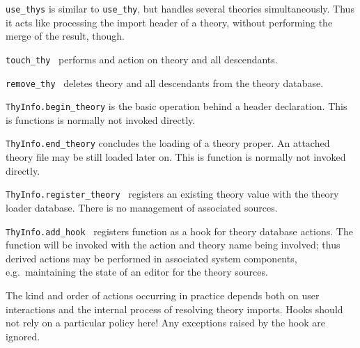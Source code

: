 \begin{isabellebody}
\begin{isamarkuptext}
\begin{description}
  \item \verb|use_thys| is similar to \verb|use_thy|, but handles
  several theories simultaneously.  Thus it acts like processing the
  import header of a theory, without performing the merge of the
  result, though.

  \item \verb|touch_thy|~ performs and  action
  on theory  and all descendants.

  \item \verb|remove_thy|~ deletes theory  and all
  descendants from the theory database.

  \item \verb|ThyInfo.begin_theory| is the basic operation behind a
  \isa{{\isasymTHEORY}} header declaration.  This is {\ML} functions is
  normally not invoked directly.

  \item \verb|ThyInfo.end_theory| concludes the loading of a theory
  proper.  An attached theory {\ML} file may be still loaded later on.
  This is function is normally not invoked directly.

  \item \verb|ThyInfo.register_theory|~ registers an
  existing theory value with the theory loader database.  There is no
  management of associated sources.

  \item \verb|ThyInfo.add_hook|~ registers function  as a hook for theory database actions.  The function will be
  invoked with the action and theory name being involved; thus derived
  actions may be performed in associated system components, e.g.\
  maintaining the state of an editor for the theory sources.

  The kind and order of actions occurring in practice depends both on
  user interactions and the internal process of resolving theory
  imports.  Hooks should not rely on a particular policy here!  Any
  exceptions raised by the hook are ignored.

  \end{description}%
\end{isamarkuptext}%
\isamarkuptrue%
%
\endisatagmlref
{\isafoldmlref}%
%
\isadelimmlref
%
\endisadelimmlref
%
\isadelimtheory
%
\endisadelimtheory
%
\isatagtheory
{}\isamarkupfalse%
%
\endisatagtheory
{\isafoldtheory}%
%
\isadelimtheory
%
\endisadelimtheory
\isanewline
\end{isabellebody}%
